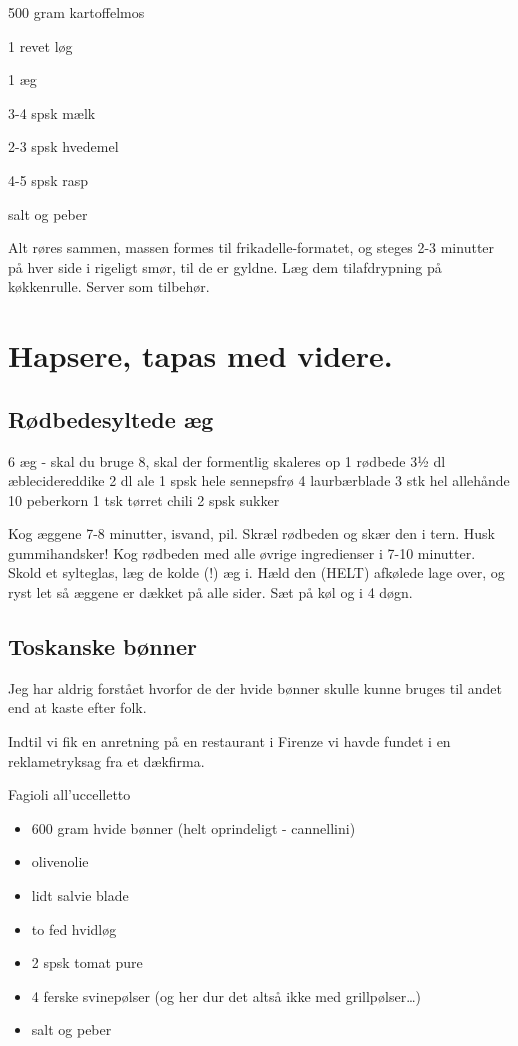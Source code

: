 \documentclass[
]{book}
\providecommand{\tightlist}{%
  \setlength{\itemsep}{0pt}\setlength{\parskip}{0pt}}
\begin{document}
500 gram kartoffelmos

1 revet løg

1 æg

3-4 spsk mælk

2-3 spsk hvedemel

4-5 spsk rasp

salt og peber

Alt røres sammen, massen formes til frikadelle-formatet, og steges 2-3 minutter på hver side i rigeligt smør, til de er gyldne. Læg dem tilafdrypning på køkkenrulle. Server som tilbehør.

\chapter{Hapsere, tapas med videre.}\label{hapsere-tapas-med-videre.}

\section{Rødbedesyltede æg}\label{ruxf8dbedesyltede-uxe6g}

6 æg - skal du bruge 8, skal der formentlig skaleres op
1 rødbede
3½ dl æblecidereddike
2 dl ale
1 spsk hele sennepsfrø
4 laurbærblade
3 stk hel allehånde
10 peberkorn
1 tsk tørret chili
2 spsk sukker

Kog æggene 7-8 minutter, isvand, pil.
Skræl rødbeden og skær den i tern. Husk gummihandsker!
Kog rødbeden med alle øvrige ingredienser i 7-10 minutter.
Skold et sylteglas, læg de kolde (!) æg i. Hæld den (HELT)
afkølede lage over, og ryst let så æggene er dækket på alle sider.
Sæt på køl og i 4 døgn.

\section{Toskanske bønner}\label{toskanske-buxf8nner}

Jeg har aldrig forstået hvorfor de der hvide bønner skulle kunne bruges til
andet end at kaste efter folk.

Indtil vi fik en anretning på en restaurant i Firenze vi havde fundet i en
reklametryksag fra et dækfirma.

Fagioli all'uccelletto

\begin{itemize}
\tightlist
\item
  600 gram hvide bønner (helt oprindeligt - cannellini)
\item
  olivenolie
\item
  lidt salvie blade
\item
  to fed hvidløg
\item
  2 spsk tomat pure
\item
  4 ferske svinepølser (og her dur det altså ikke med grillpølser\ldots)
\item
  salt og peber
\end{itemize}
\end{document}
